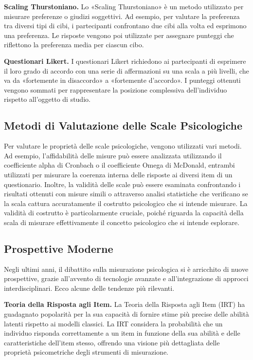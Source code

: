 \documentclass[
  letterpaper,
]{krantz}
\begin{document}
\textbf{Scaling Thurstoniano.} Lo «Scaling Thurstoniano» è un metodo
utilizzato per misurare preferenze o giudizi soggettivi. Ad esempio, per
valutare la preferenza tra diversi tipi di cibi, i partecipanti
confrontano due cibi alla volta ed esprimono una preferenza. Le risposte
vengono poi utilizzate per assegnare punteggi che riflettono la
preferenza media per ciascun cibo.

\textbf{Questionari Likert.} I questionari Likert richiedono ai
partecipanti di esprimere il loro grado di accordo con una serie di
affermazioni su una scala a più livelli, che va da «fortemente in
disaccordo» a «fortemente d'accordo». I punteggi ottenuti vengono
sommati per rappresentare la posizione complessiva dell'individuo
rispetto all'oggetto di studio.

\subsection{Metodi di Valutazione delle Scale
Psicologiche}\label{metodi-di-valutazione-delle-scale-psicologiche}

Per valutare le proprietà delle scale psicologiche, vengono utilizzati
vari metodi. Ad esempio, l'affidabilità delle misure può essere
analizzata utilizzando il coefficiente alpha di Cronbach o il
coefficiente Omega di McDonald, entrambi utilizzati per misurare la
coerenza interna delle risposte ai diversi item di un questionario.
Inoltre, la validità delle scale può essere esaminata confrontando i
risultati ottenuti con misure simili o attraverso analisi statistiche
che verificano se la scala cattura accuratamente il costrutto
psicologico che si intende misurare. La validità di costrutto è
particolarmente cruciale, poiché riguarda la capacità della scala di
misurare effettivamente il concetto psicologico che si intende
esplorare.

\subsection{Prospettive Moderne}\label{prospettive-moderne}

Negli ultimi anni, il dibattito sulla misurazione psicologica si è
arricchito di nuove prospettive, grazie all'avvento di tecnologie
avanzate e all'integrazione di approcci interdisciplinari. Ecco alcune
delle tendenze più rilevanti.

\textbf{Teoria della Risposta agli Item.} La Teoria della Risposta agli
Item (IRT) ha guadagnato popolarità per la sua capacità di fornire stime
più precise delle abilità latenti rispetto ai modelli classici. La IRT
considera la probabilità che un individuo risponda correttamente a un
item in funzione della sua abilità e delle caratteristiche dell'item
stesso, offrendo una visione più dettagliata delle proprietà
psicometriche degli strumenti di misurazione.
\end{document}
